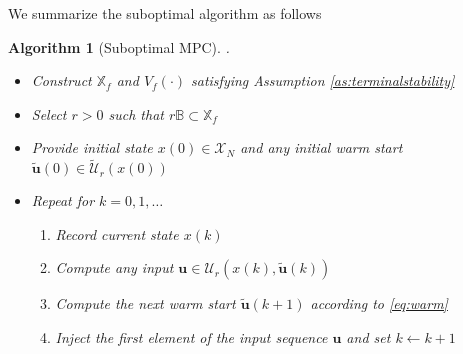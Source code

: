 \documentclass{article}
\newtheorem{algorithm}{Algorithm}
\begin{document}
We summarize the suboptimal algorithm as follows
\begin{algorithm}[Suboptimal MPC] .\\
\label{alg:suboptimal}
\begin{itemize}
\item Construct $\mathbb{X}_f$ and $V_f(\cdot)$ satisfying Assumption \ref{as:terminalstability}
\item Select $r > 0$ such that $r\mathbb{B} \subset \mathbb{X}_f$
\item Provide initial state $x(0) \in \mathcal{X}_N$ 
and any initial warm start $\tilde{\mathbf{u}}(0) \in \tilde{\mathcal{U}}_r(x(0))$
\item Repeat for $k = 0,1,\dots$
\begin{enumerate}
\item Record current state $x(k)$
\item Compute any input $\mathbf{u} \in \mathcal{U}_r(x(k),\tilde{\mathbf{u}}(k))$
\item Compute the next warm start $\tilde{\mathbf{u}}(k+1)$ according to \eqref{eq:warm}
\item Inject the first element of the input sequence $\mathbf{u}$ and set $k \leftarrow k+1$  
\end{enumerate}
\end{itemize}
\end{algorithm}
\end{document}
